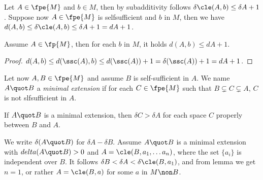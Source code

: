 Let $A\in\fpe{M}$ and $b\in M$, then
by subadditivity follows $\delta\cle(A,b)\leq\delta A+1$.
Suppose now $A\in\fpe{M}$ is selfsufficient and $b$ in $M$, then we have
$d(A,b)\leq\delta\cle(A,b)\leq\delta A+1=dA+1$.

\begin{lem}\label{piuuno}
Assume $A\in\fp{M}$, then for each $b$ in $M$, it holds $d(A,b)\leq dA+1$.
\end{lem}
\begin{proof}
$d(A,b)\leq d(\ssc(A),b)\leq d(\ssc(A))+1=\delta(\ssc(A))+1=dA+1$.
\end{proof}

\medskip
Let now $A,B\in\fpe{M}$ and assume $B$ is self-sufficient in $A$.
We name $A\quot B$ a \emph{minimal extension} if for each $C\in\fpe{M}$
such that $B\subsetneq C\subsetneq A$, $C$ is not slfsufficient in $A$.

If $A\quot B$ is a minimal extension, then $\delta C>\delta A$ for each space $C$ properly between $B$
and $A$.

We write $\delta(A\quot B)$ for $\delta A-\delta B$.
Assume $A\quot B$ is a minimal extension with $delta(A\quot B)>0$ and $A=\cle(B,a_{1},\dots a_{n})$,
where the set $\{a_{i}\}$ is independent over $B$.
It follows $\delta B<\delta A<\delta\cle(B,a_{1})$, and from lemma  we get $n=1$, or rather
$A=\cle(B,a)$ for some $a$ in $M\non B$.
